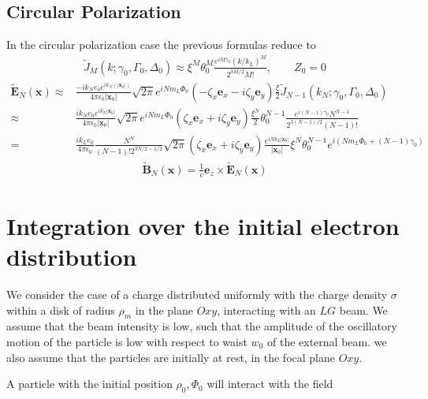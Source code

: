\subsection{Circular Polarization}
In the circular polarization case the previous formulas reduce to
\begin{align}
    \tilde J_M(k;\gamma_0, \Gamma_0, \Delta_0) \approx  \xi^M\theta_0^M\frac{e^{iM\gamma_0}(k/k_L)^{M}}{2^{3M/2}M!},\qquad Z_0=0
\end{align}
\begin{align}
    \tilde{\bm E}_N({\bm x}) \approx & \frac{-i k_N  e_0 e^{ik_N (|{\bm x}_0|)}}{4\pi\epsilon_0|{\bm x}_0|}{\sqrt{2\pi}}e^{iNm_L\varPhi_0}\left(-\zeta_x{\bm e}_x-i\zeta_y{\bm e}_y\right)\frac{\xi}2\tilde J_{N-1}(k_N;\gamma_0,\Gamma_0,\Delta_0)\nonumber                    \\
    \approx                          & \frac{i k_N  e_0 e^{ik_N |{\bm x}_0|}}{4\pi\epsilon_0|{\bm x}_0|}{\sqrt{2\pi}}e^{iNm_L\varPhi_0}\left(\zeta_x{\bm e}_x+i\zeta_y{\bm e}_y\right)\frac{\xi^N}2 \theta_0^{N-1}\frac{e^{i(N-1)\gamma_0}N^{N-1}}{2^{3(N-1)/2}(N-1)!}\nonumber \\
    =                                & \frac{i k_L  e_0}{4\pi\epsilon_0}\frac{N^N}{(N-1)!2^{3N/2-1/2}}\sqrt{2\pi}(\zeta_x{\bm e}_x+i \zeta_y{\bm e}_y)\frac{e^{iNk_L|{\bm x}_0|}}{|{\bm x}_0|}\xi^N\theta_0^{N-1}e^{i(Nm_L\varPhi_0+(N-1)\gamma_0)}\label{approx-e-n-circ}
\end{align}
\begin{align}
    \tilde{\bm B}_N({\bm x})= \frac1c{\bm e}_z\times\tilde{\bm E}_N({\bm x})
\end{align}




\section{Integration over the initial electron distribution}

We consider the case of a charge distributed uniformly with the charge density $\sigma$ within a disk of radius $\rho_m$ in the plane $Oxy$, interacting with an $LG$ beam. We assume that the beam intensity is low, such that the amplitude of the oscillatory motion of the particle is low with respect to waist $w_0$ of the external beam. we also assume that the particles are initially at rest, in the focal plane $Oxy$.

A particle with the initial position $\rho_0, \varPhi_0$ will interact with the field

